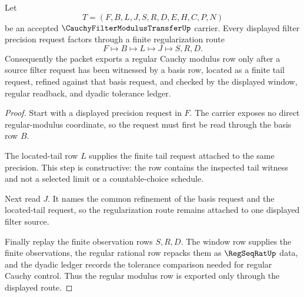 \begin{theorem}
\label{thm:cauchy-filter-modulus-transfer-basis-regularization}
Let
$$
T=(F,B,L,J,S,R,D,E,H,C,P,N)
$$
be an accepted $\CauchyFilterModulusTransferUp$ carrier. Every displayed filter precision request factors through a finite regularization route
$$
F \longmapsto B \longmapsto L \longmapsto J \longmapsto S,R,D .
$$
Consequently the packet exports a regular Cauchy modulus row only after a source filter request has been witnessed by a basis row, located as a finite tail request, refined against that basis request, and checked by the displayed window, regular readback, and dyadic tolerance ledger.
\end{theorem}
\begin{proof}
Start with a displayed precision request in $F$. The carrier exposes no direct regular-modulus coordinate, so the request must first be read through the basis row $B$.

The located-tail row $L$ supplies the finite tail request attached to the same precision. This step is constructive: the row contains the inspected tail witness and not a selected limit or a countable-choice schedule.

Next read $J$. It names the common refinement of the basis request and the located-tail request, so the regularization route remains attached to one displayed filter source.

Finally replay the finite observation rows $S,R,D$. The window row supplies the finite observations, the regular rational row repacks them as $\RegSeqRatUp$ data, and the dyadic ledger records the tolerance comparison needed for regular Cauchy control. Thus the regular modulus row is exported only through the displayed route.
\end{proof}

